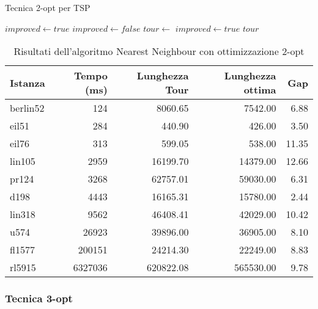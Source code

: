 \begin{algorithm}
	\caption{Tecnica 2-opt per \gls{TSP}}\label{alg:twoopt}
	\begin{algorithmic}[1]
		\State $improved \gets true$
		\State $improved \gets false$
		\State $tour \gets$ 
		\State $improved \gets true$
		\EndIf
		\EndFor
		\EndFor
		\EndWhile
		\State \Return $tour$
		\EndProcedure
	\end{algorithmic}
\end{algorithm}


\begin{table}
	\centering
	\caption{Risultati dell'algoritmo Nearest Neighbour con ottimizzazione 2-opt}
	\begin{tabular}{lrrrr}
		\toprule
		Istanza  & Tempo (ms) & Lunghezza Tour & Lunghezza ottima & Gap   \\
		\midrule
		berlin52 & 124        & 8060.65        & 7542.00          & 6.88  \\
		eil51    & 284        & 440.90         & 426.00           & 3.50  \\
		eil76    & 313        & 599.05         & 538.00           & 11.35 \\
		lin105   & 2959       & 16199.70       & 14379.00         & 12.66 \\
		pr124    & 3268       & 62757.01       & 59030.00         & 6.31  \\
		d198     & 4443       & 16165.31       & 15780.00         & 2.44  \\
		lin318   & 9562       & 46408.41       & 42029.00         & 10.42 \\
		u574     & 26923      & 39896.00       & 36905.00         & 8.10  \\
		fl1577   & 200151     & 24214.30       & 22249.00         & 8.83  \\
		rl5915   & 6327036    & 620822.08      & 565530.00        & 9.78  \\
		\bottomrule
	\end{tabular}
\end{table}


\subsubsection{Tecnica 3-opt}

